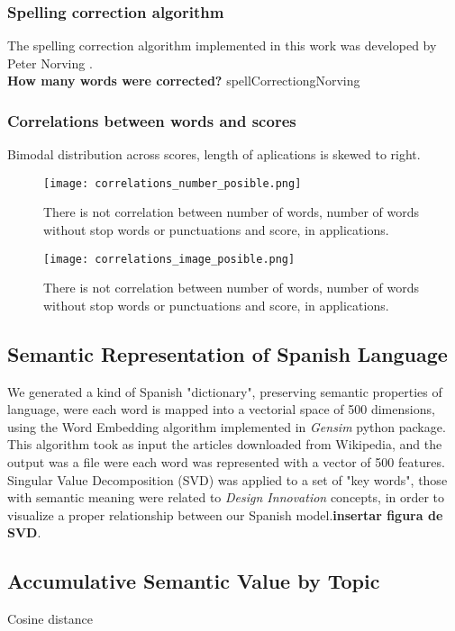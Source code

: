 \subsubsection{Spelling correction algorithm}
The spelling correction algorithm implemented in this work was developed by Peter Norving \cite{norvig2007write}. \\
\textbf{How many words were corrected?}
spellCorrectiongNorving

\subsubsection{Correlations between words and scores}
Bimodal distribution across scores, length of aplications is skewed to right.


\begin{figure}[h]
	\label{fig:correlaciones_tabla}
	\texttt{[image: correlations\_number\_posible.png]}
    \caption{There is not correlation between number of words, number of words without stop words or punctuations and score, in applications.}
\end{figure}

\begin{figure}[h]
	\label{fig:correlaciones}
	\texttt{[image: correlations\_image\_posible.png]}
    \caption{There is not correlation between number of words, number of words without stop words or punctuations and score, in applications.}
\end{figure}

\subsection{Semantic Representation of Spanish Language}
	We generated a kind of Spanish "dictionary", preserving semantic properties of language, were each word is mapped into a vectorial space of 500 dimensions, using the Word Embedding algorithm implemented in \textit{Gensim} \cite{rehurek_lrec} python package.  This algorithm took as input the articles downloaded from Wikipedia, and the output was a file were each word was represented with a vector of 500 features. \\
	Singular Value Decomposition (SVD) was applied to a set of "key words", those with semantic meaning were related to \textit{Design Innovation} concepts, in order to visualize a proper relationship between our Spanish model.\textbf{insertar figura de SVD}.

\subsection{Accumulative Semantic Value by Topic}
Cosine distance

